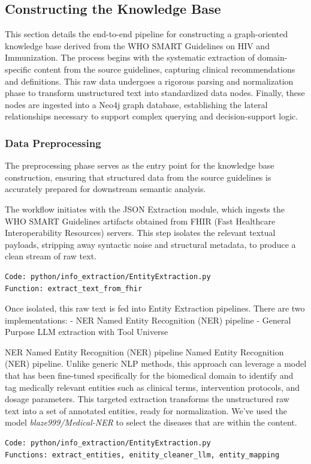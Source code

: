 
\subsection{Constructing the Knowledge Base}
This section details the end-to-end pipeline for constructing a graph-oriented knowledge base derived from the WHO SMART Guidelines on HIV and Immunization. The process begins with the systematic extraction of domain-specific content from the source guidelines, capturing clinical recommendations and definitions. This raw data undergoes a rigorous parsing and normalization phase to transform unstructured text into standardized data nodes. Finally, these nodes are ingested into a Neo4j graph database, establishing the lateral relationships necessary to support complex querying and decision-support logic.

\subsubsection{Data Preprocessing}
The preprocessing phase serves as the entry point for the knowledge base construction, ensuring that structured data from the source guidelines is accurately prepared for downstream semantic analysis.

The workflow initiates with the JSON Extraction module, which ingests the WHO SMART Guidelines artifacts obtained from FHIR (Fast Healthcare Interoperability Resources) servers. This step isolates the relevant textual payloads, stripping away syntactic noise and structural metadata, to produce a clean stream of raw text.
\begin{verbatim}
Code: python/info_extraction/EntityExtraction.py
Function: extract_text_from_fhir
\end{verbatim}

Once isolated, this raw text is fed into Entity Extraction pipelines. There are two implementations:
- NER Named Entity Recognition (NER) pipeline
- General Purpose LLM extraction with Tool Universe

NER Named Entity Recognition (NER) pipeline
Named Entity Recognition (NER) pipeline. Unlike generic NLP methods, this approach can leverage a model that has been fine-tuned specifically for the biomedical domain to identify and tag medically relevant entities such as clinical terms, intervention protocols, and dosage parameters. This targeted extraction transforms the unstructured raw text into a set of annotated entities, ready for normalization. We've used the model \textit{blaze999/Medical-NER} to select the diseases that are within the content.
\begin{verbatim}
Code: python/info_extraction/EntityExtraction.py
Functions: extract_entities, enitity_cleaner_llm, entity_mapping
\end{verbatim}


